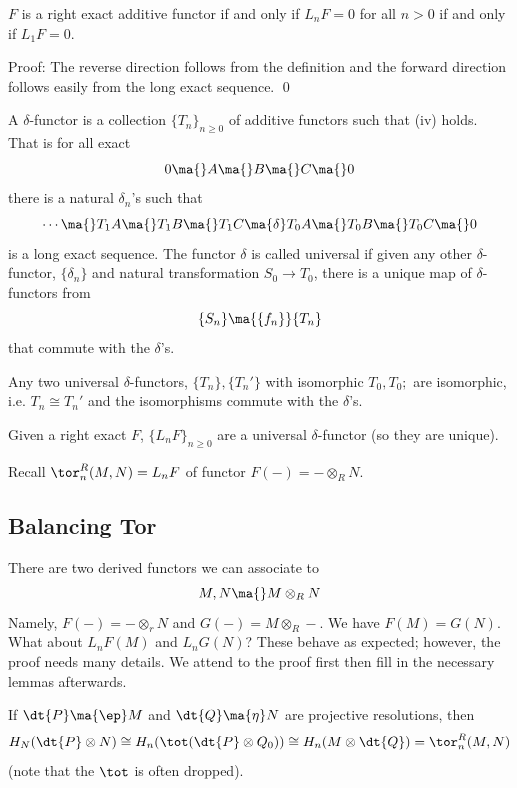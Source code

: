 \begin{prop}
$F$ is a right exact additive functor if and only if $L_nF=0$ for all $n>0$ if and only if $L_1F=0$.
\end{prop}

\noindent Proof: The reverse direction follows from the definition and the forward direction follows easily from the long exact sequence. \qed \\

\begin{dfn}
A $\delta$-functor is a collection $\{T_n\}_{n \geq 0}$ of additive functors such that (iv) holds. That is for all exact
\[
0 \ma{} A \ma{} B \ma{} C \ma{} 0
\]
there is a natural $\delta_n$'s such that 
\[
 \cdots \ma{} T_1A \ma{} T_1B \ma{} T_1C \ma{\delta} T_0A \ma{} T_0B \ma{} T_0C \ma{} 0
\]
is a long exact sequence. The functor $\delta$ is called universal if given any other $\delta$-functor, $\{\delta_n\}$ and natural transformation $S_0 \to T_0$, there is a unique map of $\delta$-functors from
\[
\{S_n\} \ma{\{f_n\}} \{T_n\}
\]
that commute with the $\delta$'s. 
\end{dfn}

\begin{cor}
Any two universal $\delta$-functors, $\{T_n\}, \{T_n'\}$ with isomorphic $T_0,T_0;$ are isomorphic, i.e. $T_n \cong T_n'$ and the isomorphisms commute with the $\delta$'s.
\end{cor}

\begin{thm}
Given a right exact $F$, $\{L_nF\}_{n \geq 0}$ are a universal $\delta$-functor (so they are unique).
\end{thm}

Recall $\tor_n^R(M,N)=L_nF$ of functor $F(-)= - \otimes_R N$.

\subsection{Balancing Tor}

There are two derived functors we can associate to 
\[
M,N \ma{} M \otimes_R N
\]
Namely, $F(-)= - \otimes_r N$ and $G(-)= M \otimes_R -$. We have $F(M)=G(N)$. What about $L_nF(M)$ and $L_nG(N)$? These behave as expected; however, the proof needs many details. We attend to the proof first then fill in the necessary lemmas afterwards.

\begin{thm}
If $\dt{P} \ma{\ep} M$ and $\dt{Q} \ma{\eta} N$ are projective resolutions, then
\[
H_N(\dt{P} \otimes N) \cong H_n(\tot(\dt{P} \otimes Q_0)) \cong H_n(M \otimes \dt{Q}) = \tor_n^R(M,N)
\]
(note that the $\tot$ is often dropped).
\end{thm}

